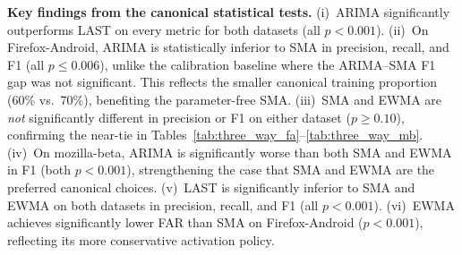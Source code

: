 \documentclass[pdflatex,sn-nature]{sn-jnl}
\theoremstyle{thmstyleone}%
\begin{document}
\begin{table}[tbp]
\centering
{}
\caption{Wilcoxon signed-rank $p$-values on the canonical
  60\%/20\%/20\% test set, mozilla-beta ($n=1{,}477$ signatures).}
\label{tab:can_wil_mb}
\end{table}

\textbf{Key findings from the canonical statistical tests.}
(i)~ARIMA significantly outperforms LAST on every metric for both datasets
(all $p < 0.001$).
(ii)~On Firefox-Android, ARIMA is statistically inferior to SMA in
precision, recall, and F1 (all $p \leq 0.006$), unlike the calibration
baseline where the ARIMA--SMA F1 gap was not significant.
This reflects the smaller canonical training proportion (60\% vs.\ 70\%),
benefiting the parameter-free SMA.
(iii)~SMA and EWMA are \emph{not} significantly different in precision
or F1 on either dataset ($p \geq 0.10$), confirming the near-tie in
Tables~\ref{tab:three_way_fa}--\ref{tab:three_way_mb}.
(iv)~On mozilla-beta, ARIMA is significantly worse than both SMA and EWMA
in F1 (both $p < 0.001$), strengthening the case that SMA and EWMA
are the preferred canonical choices.
(v)~LAST is significantly inferior to SMA and EWMA on both datasets
in precision, recall, and F1 (all $p < 0.001$).
(vi)~EWMA achieves significantly lower FAR than SMA on Firefox-Android
($p < 0.001$), reflecting its more conservative activation policy.
\end{document}
